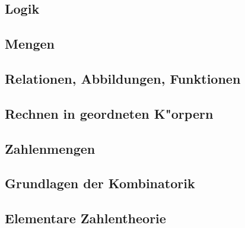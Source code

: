 \subsection{Logik}

\subsection{Mengen}

\subsection{Relationen, Abbildungen, Funktionen}

\subsection{Rechnen in geordneten K"orpern}

\subsection{Zahlenmengen}

\subsection{Grundlagen der Kombinatorik}

\subsection{Elementare Zahlentheorie}